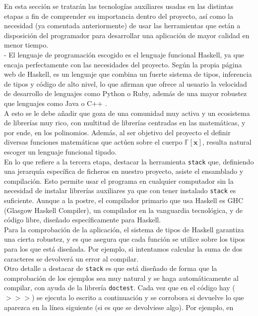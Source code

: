 En esta sección se tratarán las tecnologías auxiliares usadas en las distintas etapas a fin de comprender su importancia dentro del proyecto, así como la necesidad (ya comentada anteriormente) de usar las herramientas que están a disposición del programador para desarrollar una aplicación de mayor calidad en menor tiempo.\\
-
El lenguaje de programación escogido es el lenguaje funcional Haskell, ya que encaja perfectamente con las necesidades del proyecto. Según la propia página web de Haskell, es un lenguaje que combina un fuerte sistema de tipos, inferencia de tipos y código de alto nivel, lo que afirman que ofrece al usuario la velocidad de desarrollo de lenguajes como Python o Ruby, además de una mayor robustez que lenguajes como Java o C++ .\\

A esto se le debe añadir que goza de una comunidad muy activa y un ecosistema de librerías muy rico, con multitud de librerías centradas en las matemáticas, y por ende, en los polinomios. Además, al ser objetivo del proyecto el definir diversas funciones matemáticas que actúen sobre el cuerpo $\mathbb{F} [\textbf{x}]$, resulta natural escoger un lenguaje funcional tipado.\\

En lo que refiere a la tercera etapa, destacar la herramienta \texttt{stack} que, definiendo una jerarquía específica de ficheros en nuestro proyecto, asiste el ensamblado y compilación. Esto permite usar el programa en cualquier computador sin la necesidad de instalar librerías auxiliares ya que con tener instalado \texttt{stack} es suficiente. Aunque a la postre, el compilador primario que usa Haskell es GHC (Glasgow Haskell Compiler), un compilador en la vanguardia tecnológica, y de código libre, diseñado específicamente para Haskell.\\

Para la comprobación de la aplicación, el sistema de tipos de Haskell garantiza una cierta robustez, y es que asegura que cada función se utilice sobre los tipos para los que está diseñada. Por ejemplo, si intentamos calcular la suma de dos caracteres se devolverá un error al compilar.\\

Otro detalle a destacar de \texttt{stack} es que está diseñado de forma que la comprobación de los ejemplos sea muy natural y se haga automáticamente al compilar, con ayuda de la librería \texttt{doctest}. Cada vez que en el código hay ($>>>$) se ejecuta lo escrito a continuación y se corrobora si devuelve lo que aparezca en la línea siguiente (si es que se devolviese algo). Por ejemplo, en

